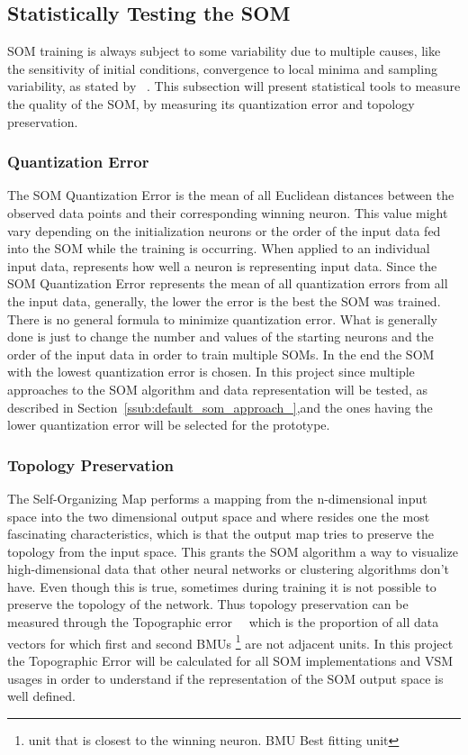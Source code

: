 \subsection{Statistically Testing the SOM} %
\label{sub:cluster_quality_testing}
SOM training is always subject to some variability due to multiple causes, like the sensitivity of initial conditions, convergence to local minima and sampling variability, as stated by ~\citet{Bodt}. This subsection will present statistical tools to measure the quality of the SOM, by measuring its quantization error and topology preservation.

\subsubsection{Quantization Error} %
\label{ssub:quantization_error}
The SOM Quantization Error is the mean of all Euclidean distances between the observed data points and their corresponding winning neuron. This value might vary depending on the initialization neurons or the order of the input data fed into the SOM while the training is occurring. When applied to an individual input data, represents how well a neuron is representing input data. Since the SOM Quantization Error represents the mean of all quantization errors from all the input data, generally, the lower the error is the best the SOM was trained.
\\
There is no general formula to minimize quantization error\cite{Bodt}. What is generally done is just to change the number and values of the starting neurons and the order of the input data in order to train multiple SOMs. In the end the SOM with the lowest quantization error is chosen.
In this project since multiple approaches to the SOM algorithm and data representation will be tested, as described in Section~\ref{ssub:default_som_approach_},and the ones having the lower quantization error will be selected for the prototype.

\subsubsection{Topology Preservation} %
\label{ssub:topology_preservation}
The Self-Organizing Map performs a mapping from the n-dimensional input space into the two dimensional output space and where resides one the most fascinating characteristics, which is that the output map tries to preserve the topology from the input space. This grants the SOM algorithm a way to visualize high-dimensional data that other neural networks or clustering algorithms don't have. Even though this is true, sometimes during training it is not possible to preserve the topology of the network.
Thus topology preservation can be measured through the Topographic error~~\citet{Kiviluoto1996} which is the proportion of all data vectors for which first and second BMUs \footnote{unit that is closest to the winning neuron. BMU Best fitting unit } are not adjacent units.
In this project the Topographic Error will be calculated for all SOM implementations and VSM usages in order to understand if the representation of the SOM output space is well defined.

